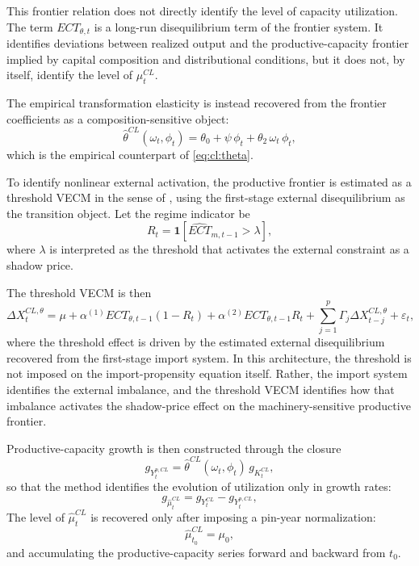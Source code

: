 This frontier relation does not directly identify the level of capacity
utilization. The term $ECT_{\theta,t}$ is a long-run disequilibrium term
of the frontier system. It identifies deviations between realized
output and the productive-capacity frontier implied by capital
composition and distributional conditions, but it does not, by itself,
identify the level of $\mu_t^{CL}$.

The empirical transformation elasticity is instead recovered from the
frontier coefficients as a composition-sensitive object:
%
\begin{equation}
	\hat{\theta}^{CL}(\omega_t,\phi_t)
	=
	\theta_0
	+
	\psi\,\phi_t
	+
	\theta_2\,\omega_t\,\phi_t,
	\label{eq:cl:theta_hat}
\end{equation}
%
which is the empirical counterpart of
\eqref{eq:cl:theta}.

To identify nonlinear external activation, the productive frontier is
estimated as a threshold VECM in the sense of \citet{Seo2006}, using
the first-stage external disequilibrium as the transition object. Let
the regime indicator be
%
\begin{equation}
	R_t
	=
	\mathbf{1}\!\left[\widehat{ECT}_{m,t-1} > \lambda\right],
	\label{eq:cl:regime_indicator}
\end{equation}
%
where $\lambda$ is interpreted as the threshold that activates the
external constraint as a shadow price.

The threshold VECM is then
%
\begin{equation}
	\Delta X_t^{CL,\theta}
	=
	\mu
	+
	\alpha^{(1)} ECT_{\theta,t-1}(1-R_t)
	+
	\alpha^{(2)} ECT_{\theta,t-1}R_t
	+
	\sum_{j=1}^{p}\Gamma_j \Delta X_{t-j}^{CL,\theta}
	+
	\varepsilon_t,
	\label{eq:cl:tvecm_theta}
\end{equation}
%
where the threshold effect is driven by the estimated external
disequilibrium recovered from the first-stage import system. In this
architecture, the threshold is not imposed on the import-propensity
equation itself. Rather, the import system identifies the external
imbalance, and the threshold VECM identifies how that imbalance
activates the shadow-price effect on the machinery-sensitive productive
frontier.

Productive-capacity growth is then constructed through the closure
%
\begin{equation}
	g_{Y_t^{p,CL}}
	=
	\hat{\theta}^{CL}(\omega_t,\phi_t)\,g_{K_t^{CL}},
	\label{eq:cl:frontier_growth}
\end{equation}
%
so that the method identifies the evolution of utilization only in
growth rates:
%
\begin{equation}
	g_{\hat{\mu}_t^{CL}}
	=
	g_{Y_t^{CL}}
	-
	g_{Y_t^{p,CL}},
	\label{eq:cl:mu_growth}
\end{equation}
%
The level of $\hat{\mu}_t^{CL}$ is recovered only after imposing a
pin-year normalization:
%
\begin{equation}
	\hat{\mu}_{t_0}^{CL}
	=
	\mu_0,
	\label{eq:cl:mu_pin}
\end{equation}
%
and accumulating the productive-capacity series forward and backward
from $t_0$.

